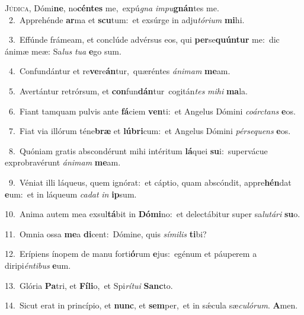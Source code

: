 \lettrine{\initial\textcolor{\initialcolor}{J}}{údica,} Dómi\-\textbf{ne}\-, no\-\textbf{cén}\-\textbf{tes} me,~\star expú\textit{gna} \textit{im}\-\textit{pu}\textbf{gnán}tes me.\\
{\numbfont\textcolor{\numbcolor}{~2.}}~Apprehénde \textbf{ar}\-ma et \textbf{scu}\-tum:~\star et exsúrge in adju\-\textit{tó}\-\textit{ri}\textit{um} \textbf{mi}\-hi.\par
{\numbfont\textcolor{\numbcolor}{~3.}}~Effúnde frámeam, et conclúde advérsus eos, qui \textbf{per}\-se\-\textbf{quún}\-\textbf{tur} me:~\star dic ánimæ meæ: Sa\textit{lus} \textit{tu}\-\textit{a} \textbf{e}\-go sum.\par
{\numbfont\textcolor{\numbcolor}{~4.}}~Confundántur et re\-\textbf{ve}\-re\-\textbf{án}\-tur,~\star quæréntes \textit{á}\-\textit{ni}\textit{mam} \textbf{me}\-am.\par
{\numbfont\textcolor{\numbcolor}{~5.}}~Avertántur retrórsum, et \textbf{con}\-fun\-\textbf{dán}\-tur~\star cogitán\textit{tes} \textit{mi}\-\textit{hi} \textbf{ma}\-la.\par
{\numbfont\textcolor{\numbcolor}{~6.}}~Fiant tamquam pulvis ante \textbf{fá}\-ciem \textbf{ven}\-ti:~\star et Angelus Dómini \textit{co}\-\textit{árc}\textit{tans} \textbf{e}\-os.\par
{\numbfont\textcolor{\numbcolor}{~7.}}~Fiat via illórum téne\textbf{bræ} et \textbf{lú}\-\textbf{bri}cum:~\star et Angelus Dómini \textit{pér}\-\textit{se}\textit{quens} \textbf{e}\-os.\par
{\numbfont\textcolor{\numbcolor}{~8.}}~Quóniam gratis abscondérunt mihi intéritum \textbf{lá}\-quei \textbf{su}\-i:~\star supervácue exprobravérunt \textit{á}\-\textit{ni}\textit{mam} \textbf{me}\-am.\par
{\numbfont\textcolor{\numbcolor}{~9.}}~Véniat illi láqueus, quem ignórat:~\dagger et cáptio, quam abscóndit, appre\-\textbf{hén}\-dat \textbf{e}\-um:~\star et in láqueum \textit{ca}\-\textit{dat} \textit{in} \textbf{ip}\-sum.\par
{\numbfont\textcolor{\numbcolor}{10.}}~Anima autem mea exsul\-\textbf{tá}\-bit in \textbf{Dó}\-\textbf{mi}no:~\star et delectábitur super sa\-\textit{lu}\-\textit{tá}\textit{ri} \textbf{su}\-o.\par
{\numbfont\textcolor{\numbcolor}{11.}}~Omnia ossa \textbf{me}\-a \textbf{di}\-cent:~\star Dómine, quis \textit{sí}\-\textit{mi}\textit{lis} \textbf{ti}\-bi?\par
{\numbfont\textcolor{\numbcolor}{12.}}~Erípiens ínopem de manu forti\-\textbf{ó}\-rum \textbf{e}\-jus:~\star egénum et páuperem a diripi\-\textit{én}\-\textit{ti}\textit{bus} \textbf{e}\-um.\par
{\numbfont\textcolor{\numbcolor}{13.}}~Glória \textbf{Pa}\-tri, et \textbf{Fí}\-\textbf{li}o,~\star et Spi\-\textit{rí}\-\textit{tu}\textit{i} \textbf{Sanc}\-to.\par
{\numbfont\textcolor{\numbcolor}{14.}}~Sicut erat in princípio, et \textbf{nunc}\-, et \textbf{sem}\-per,~\star et in sǽcula sæ\-\textit{cu}\-\textit{ló}\textit{rum}. \textbf{A}\-men.\par
